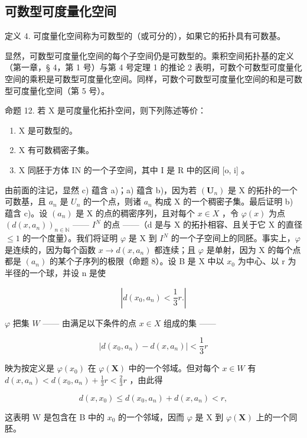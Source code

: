 \subsection{可数型可度量化空间}

定义 4. 可度量化空间称为可数型的（或可分的），如果它的拓扑具有可数基。

显然，可数型可度量化空间的每个子空间仍是可数型的。乘积空间拓扑基的定义（第一章，§ 4，第 1 号）与第 4 号定理 1 的推论 2 表明，可数个可数型可度量化空间的乘积是可数型可度量化空间。同样，可数个可数型可度量化空间的和是可数型可度量化空间（第 5 号）。

命题 12. 若 X 是可度量化拓扑空间，则下列陈述等价：

\begin{enumerate}
\def\labelenumi{\alph{enumi})}
\item
  X 是可数型的。
\item
  X 有可数稠密子集。
\item
  X 同胚于方体 IN 的一个子空间，其中 I 是 R 中的区间 {[}o, i{]} 。
\end{enumerate}

由前面的注记，显然 c) 蕴含 a)；a) 蕴含 b)，因为若 \((\mathbf{U}_{n})\) 是 X 的拓扑的一个可数基，且 \(a_{n}\) 是 \(U_{n}\) 的一个点，则诸 \(a_{n}\) 构成 X 的一个稠密子集。最后证明 b) 蕴含 c)。设 \((a_{n})\) 是 X 的点的稠密序列，且对每个 \(x \in X\) ，令 \(\varphi(x)\) 为点 \((d(x, a_{n}))_{n \in \mathbb{N}}\) —— \(I^{N}\) 的点 ——（d 是与 X 的拓扑相容、且关于它 X 的直径 \(\leqslant 1\) 的一个度量）。我们将证明 \(\varphi\) 是 X 到 \(I^{N}\) 的一个子空间上的同胚。事实上，\(\varphi\) 是连续的，因为每个函数 \(x \to d(x, a_{n})\) 都连续；且 \(\varphi\) 是单射，因为 X 的每个点都是 \((a_{n})\) 的某个子序列的极限（命题 8）。设 B 是 X 中以 \(x_{0}\) 为中心、以 r 为半径的一个球，并设 n 是使

\[
\left| d (x _ {0}, a _ {n}) <   \frac {1}{3} r. \right|
\]

\(\varphi\) 把集 \(W\) —— 由满足以下条件的点 \(x\in X\) 组成的集 ——

\[
\left| d (x _ {0}, a _ {n}) - d (x, a _ {n}) \right| <   \frac {1}{3} r
\]

映为按定义是 \(\varphi(x_0)\) 在 \(\varphi(\mathbf{X})\) 中的一个邻域。但对每个 \(x \in W\) 有 \(d(x, a_n) < d(x_0, a_n) + \frac{1}{3} r < \frac{2}{3} r\) ，由此得

\[
d (x, x _ {0}) \leqslant d (x _ {0}, a _ {n}) + d (x, a _ {n}) <   r,
\]

这表明 W 是包含在 B 中的 \(x_{0}\) 的一个邻域，因而 \(\varphi\) 是 X 到 \(\varphi(\mathbf{X})\) 上的一个同胚。

